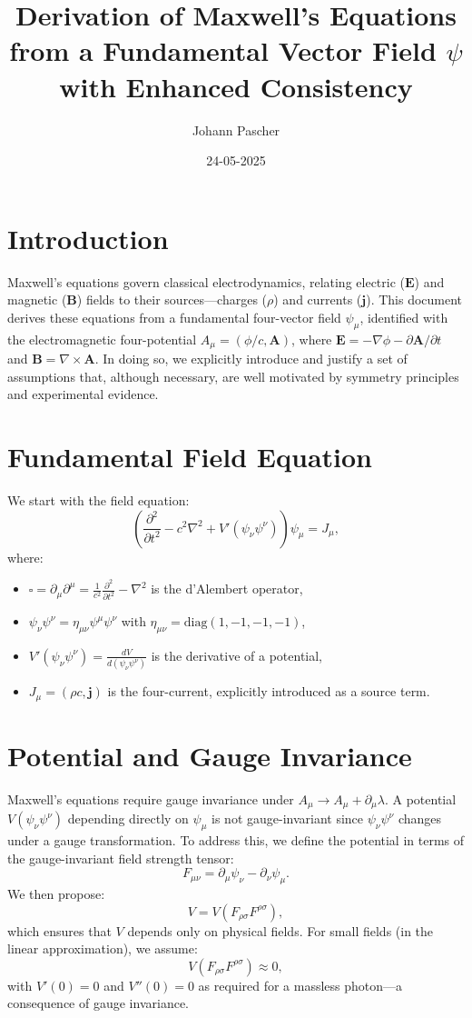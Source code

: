 \documentclass{article}
\title{Derivation of Maxwell's Equations from a Fundamental Vector Field \(\psi\) with Enhanced Consistency}
\author{Johann Pascher}
\date{24-05-2025}
\begin{document}
	
	\maketitle
	
	\section{Introduction}
	Maxwell’s equations govern classical electrodynamics, relating electric (\(\mathbf{E}\)) and magnetic (\(\mathbf{B}\)) fields to their sources—charges (\(\rho\)) and currents (\(\mathbf{j}\)). This document derives these equations from a fundamental four-vector field \(\psi_\mu\), identified with the electromagnetic four-potential \(A_\mu = (\phi/c, \mathbf{A})\), where \(\mathbf{E} = -\nabla \phi - \partial \mathbf{A}/\partial t\) and \(\mathbf{B} = \nabla \times \mathbf{A}\). In doing so, we explicitly introduce and justify a set of assumptions that, although necessary, are well motivated by symmetry principles and experimental evidence.
	
	\section{Fundamental Field Equation}
	We start with the field equation:
	\[
	\left( \frac{\partial^2}{\partial t^2} - c^2 \nabla^2 + V'(\psi_\nu \psi^\nu) \right) \psi_\mu = J_\mu,
	\]
	where:
	\begin{itemize}
		\item \(\square = \partial_\mu \partial^\mu = \frac{1}{c^2} \frac{\partial^2}{\partial t^2} - \nabla^2\) is the d'Alembert operator,
		\item \(\psi_\nu \psi^\nu = \eta_{\mu\nu} \psi^\mu \psi^\nu\) with \(\eta_{\mu\nu} = \text{diag}(1, -1, -1, -1)\),
		\item \(V'(\psi_\nu \psi^\nu) = \frac{dV}{d(\psi_\nu \psi^\nu)}\) is the derivative of a potential,
		\item \(J_\mu = (\rho c, \mathbf{j})\) is the four-current, explicitly introduced as a source term.
	\end{itemize}
	
	\section{Potential and Gauge Invariance}
	Maxwell’s equations require gauge invariance under \(A_\mu \to A_\mu + \partial_\mu \lambda\). A potential \(V(\psi_\nu \psi^\nu)\) depending directly on \(\psi_\mu\) is not gauge-invariant since \(\psi_\nu \psi^\nu\) changes under a gauge transformation. To address this, we define the potential in terms of the gauge-invariant field strength tensor:
	\[
	F_{\mu\nu} = \partial_\mu \psi_\nu - \partial_\nu \psi_\mu.
	\]
	We then propose:
	\[
	V = V(F_{\rho\sigma} F^{\rho\sigma}),
	\]
	which ensures that \(V\) depends only on physical fields. For small fields (in the linear approximation), we assume:
	\[
	V(F_{\rho\sigma} F^{\rho\sigma}) \approx 0,
	\]
	with \(V'(0) = 0\) and \(V''(0) = 0\) as required for a massless photon—a consequence of gauge invariance.
	
\end{document}
